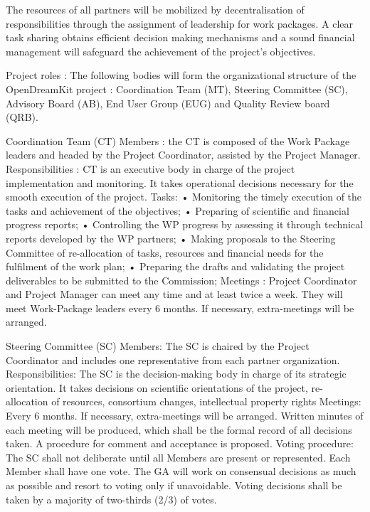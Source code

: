 The resources of all partners will be mobilized by decentralisation of responsibilities through the assignment of 
leadership for work packages. A clear task sharing obtains efficient decision making mechanisms and a sound 
financial management will safeguard the achievement of the project’s objectives.

Project roles : 
The following bodies will form the organizational structure of the OpenDreamKit project : 
Coordination Team (MT), Steering Committee (SC), Advisory Board (AB), 
End User Group (EUG) and Quality Review board (QRB).


Coordination Team (CT) 
Members :  the CT is composed of the Work Package leaders and headed by the Project Coordinator, 
assisted by the Project Manager. 
Responsibilities : CT is an executive body in charge of the project implementation and monitoring. 
It takes operational decisions necessary for the smooth execution of the project. 
Tasks: 
•	Monitoring the timely execution of the tasks and achievement of the objectives;
•	Preparing of scientific and financial progress reports;
•	Controlling the WP progress by assessing it through technical reports developed by the WP partners;
•	Making proposals to the Steering Committee of re-allocation of tasks, resources and financial needs for the fulfilment of the work plan;
•	Preparing the drafts and validating the project deliverables to be submitted to the Commission;
Meetings : Project Coordinator and Project Manager can meet any time and at least twice a week. They will meet Work-Package leaders every 6 months. If necessary, extra-meetings will be arranged. 

Steering Committee (SC)
Members: The SC is chaired by the Project Coordinator and includes one representative from each partner organization. 
Responsibilities: The SC is the decision-making body in charge of its strategic orientation. 
It takes decisions on scientific orientations of the project, re-allocation of resources, consortium changes,
intellectual property rights
Meetings: Every 6 months. If necessary, extra-meetings will be arranged.  Written minutes of each meeting will be produced, which shall be the formal record of all decisions taken. A procedure for comment and acceptance is proposed.
Voting procedure: The SC shall not deliberate until all Members are present or represented. 
Each Member shall have one vote. The GA will work on consensual decisions as much as possible and resort 
to voting only if unavoidable. Voting decisions shall be taken by a majority of two-thirds (2/3) of votes.

